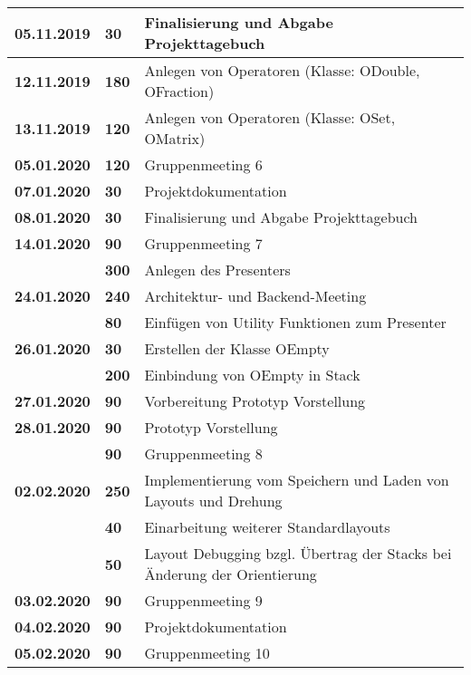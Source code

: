 {\begin{longtable}{|l|l|p{11cm}|}
		\\ \hline \textbf{05.11.2019}
			& \textbf{\hfill 30} & Finalisierung und Abgabe Projekttagebuch
		\\ \hline \textbf{12.11.2019}
			& \textbf{\hfill 180} & Anlegen von Operatoren (Klasse: ODouble, OFraction) 
		\\ \hline \textbf{13.11.2019}
			& \textbf{\hfill 120} & Anlegen von Operatoren (Klasse: OSet, OMatrix) 
		\\ \hline \textbf{05.01.2020}
			& \textbf{\hfill 120} & Gruppenmeeting 6
		\\ \hline \textbf{07.01.2020}
			& \textbf{\hfill 30} & Projektdokumentation
		\\ \hline \textbf{08.01.2020}
			& \textbf{\hfill 30} & Finalisierung und Abgabe Projekttagebuch
		\\ \hline \textbf{14.01.2020}
			& \textbf{\hfill 90} & Gruppenmeeting 7 \\\cline{2-3}
			& \textbf{\hfill 300} & Anlegen des Presenters
		\\ \hline \textbf{24.01.2020}
			& \textbf{\hfill 240} & Architektur- und Backend-Meeting \\\cline{2-3}
			& \textbf{\hfill 80} & Einfügen von Utility Funktionen zum Presenter 
		\\ \hline \textbf{26.01.2020}
			& \textbf{\hfill 30} & Erstellen der Klasse OEmpty  \\\cline{2-3}
			& \textbf{\hfill 200} & Einbindung von OEmpty in Stack 
		\\ \hline \textbf{27.01.2020}
			& \textbf{\hfill 90} & Vorbereitung Prototyp Vorstellung
		\\ \hline \textbf{28.01.2020}
			& \textbf{\hfill 90} & Prototyp Vorstellung \\\cline{2-3}
			& \textbf{\hfill 90} & Gruppenmeeting 8
		\\ \hline \textbf{02.02.2020}
			& \textbf{\hfill 250} & Implementierung vom Speichern und Laden von Layouts und Drehung \\\cline{2-3}
			& \textbf{\hfill 40} & Einarbeitung weiterer Standardlayouts  \\\cline{2-3}
			& \textbf{\hfill 50} & Layout Debugging bzgl. Übertrag der Stacks bei Änderung der Orientierung
		\\ \hline \textbf{03.02.2020}
			& \textbf{\hfill 90} & Gruppenmeeting 9
		\\ \hline \textbf{04.02.2020}
			& \textbf{\hfill 90} & Projektdokumentation
		\\ \hline \textbf{05.02.2020}
			& \textbf{\hfill 90} & Gruppenmeeting 10 
		\\ \hline
	\end{longtable}
}

